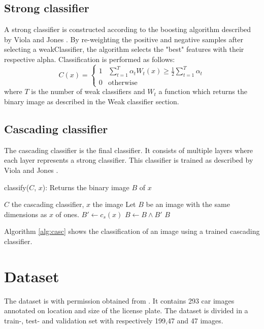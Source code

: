 \documentclass[a4paper,11pt]{article}
\begin{document}
\subsection*{Strong classifier}
A strong classifier is constructed according to the boosting algorithm
described by Viola and Jones \cite{viola}.  By re-weighting the positive and
negative samples after selecting a weakClassifier, the algorithm selects the
"best" features with their respective alpha. Classification is performed as
follows:
\begin{displaymath}
C(x) = 
	\left\{ \begin{array}{ll}
		1 & \sum^T_{t=1} \alpha_t W_t(x) \ge \frac{1}{2} \sum^T_{t=1}\alpha_t \\
		0 & \textrm{otherwise}
	\end{array} \right.
\end{displaymath}
where $T$ is the number of weak classifiers and $W_t$ a function which returns
the binary image as described in the Weak classifier section.

\subsection*{Cascading classifier}
The cascading classifier is the final classifier. It consists of multiple
layers where each layer represents a strong classifier. This classifier is
trained as described by Viola and Jones \cite{viola}. 
\begin{algorithm}
	\caption{classify($C$, $x$): Returns the binary image $B$ of $x$}
	\begin{algorithmic}[1]
	\REQUIRE $C$ the cascading classifier, $x$ the image
	\medskip
	\STATE Let $B$ be an image with the same dimensions as $x$ of ones.
		\STATE $B' \leftarrow c_s(x)$
		\STATE $B \leftarrow B \land B'$
	\ENDFOR
	\RETURN $B$
	\end{algorithmic}
\label{alg:casc}
\end{algorithm}
Algorithm \ref{alg:casc} shows the classification of an image using a trained
cascading classifier.

\section*{Dataset}
The dataset is with permission obtained from \cite{dlagnekov_dataset}. It
contains 293 car images annotated on location and size of the license plate.
The dataset is divided in a train-, test- and validation set with respectively
199,47 and 47 images.
\end{document}
